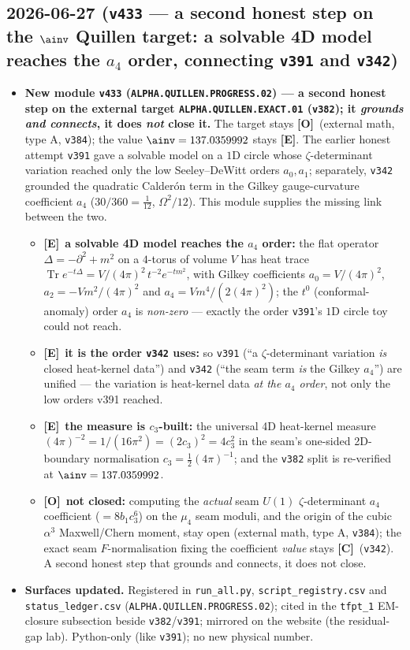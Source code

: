 \documentclass[11pt]{article}
\providecommand{\mE}{\textbf{[E]}}\providecommand{\mC}{\textbf{[C]}}
\providecommand{\mO}{\textbf{[O]}}\providecommand{\mX}{\textbf{[X]}}
\providecommand{\vref}[1]{\texttt{#1}}
\providecommand{\cthree}{c_3}\providecommand{\phiz}{\varphi_0^{\mathrm{ret}}}
\begin{document}
\subsection*{2026-06-27 (\texttt{v433} --- a second honest step on the $\ainv$ Quillen target: a solvable 4D model reaches the $a_4$ order, connecting \texttt{v391} and \texttt{v342})}
\begin{itemize}
\item \textbf{New module \texttt{v433} (\texttt{ALPHA.QUILLEN.PROGRESS.02}) --- a second honest step on the
external target \texttt{ALPHA.QUILLEN.EXACT.01} (\vref{v382}); it \emph{grounds and connects}, it does
\emph{not} close it.} The target stays \mO\ (external math, type A, \vref{v384}); the value $\ainv=137.0359992$
stays \mE. The earlier honest attempt \vref{v391} gave a solvable model on a $1$D circle whose
$\zeta$-determinant variation reached only the low Seeley--DeWitt orders $a_0,a_1$; separately, \vref{v342}
grounded the quadratic Calder\'on term in the Gilkey gauge-curvature coefficient $a_4$ ($30/360=\tfrac1{12}$,
$\Omega^2/12$). This module supplies the missing link between the two.
\begin{itemize}
\item \mE\ \textbf{a solvable 4D model reaches the $a_4$ order:} the flat operator $\Delta=-\partial^2+m^2$ on a
$4$-torus of volume $V$ has heat trace $\operatorname{Tr}e^{-t\Delta}=V/(4\pi)^2\,t^{-2}e^{-tm^2}$, with Gilkey
coefficients $a_0=V/(4\pi)^2$, $a_2=-Vm^2/(4\pi)^2$ and $a_4=Vm^4/(2(4\pi)^2)$; the $t^0$ (conformal-anomaly)
order $a_4$ is \emph{non-zero} --- exactly the order \vref{v391}'s $1$D circle toy could not reach.
\item \mE\ \textbf{it is the order \vref{v342} uses:} so \vref{v391} (``a $\zeta$-determinant variation \emph{is}
closed heat-kernel data'') and \vref{v342} (``the seam term \emph{is} the Gilkey $a_4$'') are unified --- the
variation is heat-kernel data \emph{at the $a_4$ order}, not only the low orders v391 reached.
\item \mE\ \textbf{the measure is $\cthree$-built:} the universal 4D heat-kernel measure
$(4\pi)^{-2}=1/(16\pi^2)=(2\cthree)^2=4\cthree^2$ in the seam's one-sided 2D-boundary normalisation
$\cthree=\tfrac12(4\pi)^{-1}$; and the \vref{v382} split is re-verified at $\ainv=137.0359992$.
\item \mO\ \textbf{not closed:} computing the \emph{actual} seam $U(1)$ $\zeta$-determinant $a_4$ coefficient
($=8b_1\cthree^6$) on the $\mu_4$ seam moduli, and the origin of the cubic $\alpha^3$ Maxwell/Chern moment, stay
open (external math, type A, \vref{v384}); the exact seam $F$-normalisation fixing the coefficient \emph{value}
stays \mC\ (\vref{v342}). A second honest step that grounds and connects, it does not close.
\end{itemize}
\item \textbf{Surfaces updated.} Registered in \texttt{run\_all.py}, \texttt{script\_registry.csv} and
\texttt{status\_ledger.csv} (\texttt{ALPHA.QUILLEN.PROGRESS.02}); cited in the \texttt{tfpt\_1} EM-closure
subsection beside \vref{v382}/\vref{v391}; mirrored on the website (the residual-gap lab). Python-only (like
\vref{v391}); no new physical number.
\end{itemize}
\end{document}
